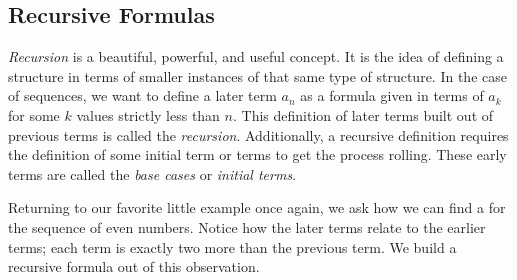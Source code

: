\subsection{Recursive Formulas}

\emph{Recursion} is a beautiful, powerful, and useful concept.  It is the idea of defining a structure in terms of smaller instances of that same type of structure.  In the case of sequences, we want to define a later term $a_n$ as a formula given in terms of $a_k$ for some $k$ values strictly less than $n$.  This definition of later terms built out of previous terms is called the \emph{recursion}.  Additionally, a recursive definition requires the definition of some initial term or terms to get the process rolling.  These early terms are called the \emph{base cases} or \emph{initial terms}.

Returning to our favorite little example once again, we ask how we can find a  for the sequence of even numbers.  Notice how the later terms relate to the earlier terms; each term is exactly two more than the previous term.  We build a recursive formula out of this observation.

